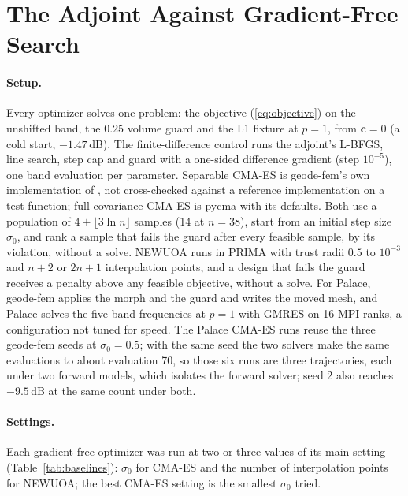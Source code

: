 \documentclass{anvil-paper}
\begin{document}
\section{The Adjoint Against Gradient-Free Search}
\label{sec:baselines}

\paragraph{Setup.}
Every optimizer solves one problem: the objective (\ref{eq:objective}) on
the unshifted band, the $0.25$ volume guard and the L1 fixture at $p = 1$,
from $\mathbf{c} = 0$ (a cold start, $-1.47$\,dB). The finite-difference control runs the
adjoint's L-BFGS, line search, step cap and guard with a one-sided
difference gradient (step $10^{-5}$), one band evaluation per parameter.
Separable CMA-ES is geode-fem's own implementation of
\citet{ros2008separable}, not cross-checked against a reference
implementation on a test function; full-covariance CMA-ES is pycma
\citep{pycma} with its defaults. Both use a population of
$4 + \lfloor 3\ln n\rfloor$ samples (14 at $n = 38$), start from an initial
step size $\sigma_0$, and rank a sample
that fails the guard after every feasible sample, by its violation, without
a solve. NEWUOA runs in PRIMA with trust radii $0.5$ to $10^{-3}$ and $n + 2$
or $2n + 1$ interpolation points, and a design that fails the guard receives
a penalty above any feasible objective, without a solve. For Palace,
geode-fem applies the morph and the guard and writes the moved mesh, and
Palace solves the five band frequencies at $p = 1$ with GMRES on 16 MPI
ranks, a configuration not tuned for speed. The Palace CMA-ES runs reuse the
three geode-fem seeds at $\sigma_0 = 0.5$; with the same seed the two solvers
make the same evaluations to about evaluation 70, so those six runs are
three trajectories, each under two forward models, which isolates the
forward solver; seed 2 also reaches $-9.5$\,dB at the same count under both.

\paragraph{Settings.}
Each gradient-free optimizer was run at two or three values of its main setting
(Table~\ref{tab:baselines}): $\sigma_0$ for CMA-ES and the number of
interpolation points for NEWUOA; the best CMA-ES setting is the
smallest $\sigma_0$ tried.
\end{document}

